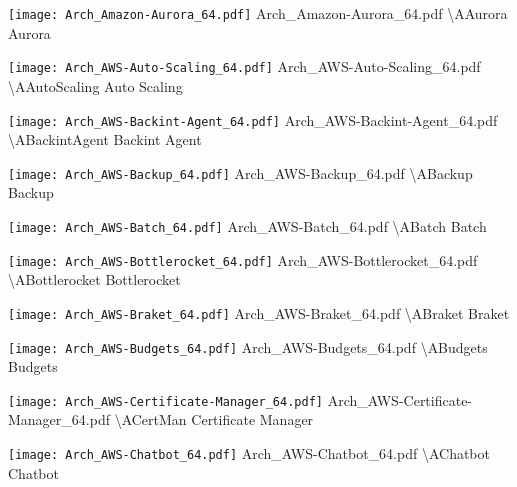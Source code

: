  {\texttt{[image: Arch\_Amazon-Aurora\_64.pdf]}} {Arch\_Amazon-Aurora\_64.pdf} {{\textbackslash}AAurora} {Aurora}

 {\texttt{[image: Arch\_AWS-Auto-Scaling\_64.pdf]}} {Arch\_AWS-Auto-Scaling\_64.pdf} {{\textbackslash}AAutoScaling} {Auto Scaling}

 {\texttt{[image: Arch\_AWS-Backint-Agent\_64.pdf]}} {Arch\_AWS-Backint-Agent\_64.pdf} {{\textbackslash}ABackintAgent} {Backint Agent}

 {\texttt{[image: Arch\_AWS-Backup\_64.pdf]}} {Arch\_AWS-Backup\_64.pdf} {{\textbackslash}ABackup} {Backup}

 {\texttt{[image: Arch\_AWS-Batch\_64.pdf]}} {Arch\_AWS-Batch\_64.pdf} {{\textbackslash}ABatch} {Batch}

 {\texttt{[image: Arch\_AWS-Bottlerocket\_64.pdf]}} {Arch\_AWS-Bottlerocket\_64.pdf} {{\textbackslash}ABottlerocket} {Bottlerocket}

 {\texttt{[image: Arch\_AWS-Braket\_64.pdf]}} {Arch\_AWS-Braket\_64.pdf} {{\textbackslash}ABraket} {Braket}

 {\texttt{[image: Arch\_AWS-Budgets\_64.pdf]}} {Arch\_AWS-Budgets\_64.pdf} {{\textbackslash}ABudgets} {Budgets}

 {\texttt{[image: Arch\_AWS-Certificate-Manager\_64.pdf]}} {Arch\_AWS-Certificate-Manager\_64.pdf} {{\textbackslash}ACertMan} {Certificate Manager}

 {\texttt{[image: Arch\_AWS-Chatbot\_64.pdf]}} {Arch\_AWS-Chatbot\_64.pdf} {{\textbackslash}AChatbot} {Chatbot}

